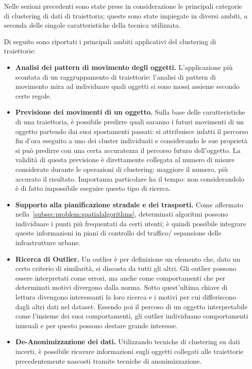 Nelle sezioni precedenti sono state prese in considerazione le principali categorie di clustering di dati di traiettoria; queste sono state impiegate in
diversi ambiti, a seconda delle singole caratteristiche della tecnica utilizzata.

Di seguito sono riportati i principali ambiti applicativi del clustering di traiettorie:

\begin{itemize}

  \item \textbf{Analisi dei pattern di movimento degli oggetti.}
  L'applicazione più scontata di un raggruppamento di traiettorie: l'analisi di pattern di
  movimento mira ad individuare quali oggetti si sono mossi assieme secondo certe regole.

  \item \textbf{Previsione dei movimenti di un oggetto.}
  Sulla base delle caratteristiche di una traiettoria, è possibile predirre quali saranno
  i futuri movimenti di un oggetto partendo dai suoi spostamenti passati: si attribuisce infatti
  il percorso fin d'ora eseguito a uno dei cluster individuati e considerando le sue proprietà
  si può predirre con una certa accuratezza il percorso futuro dell'oggetto.
  La validità di questa previsione è direttamente collegata al numero di misure considerate durante
  le operazioni di clustering: maggiore il numero, più accurato il risultato.
  Importanza particolare ha il tempo: non considerandolo è di fatto impossibile eseguire questo tipo
  di ricerca.

  \item \textbf{Supporto alla pianificazione stradale e dei trasporti.}
  Come affermato nella~\cref*{subsec:problem:spatialalgorithms}, determinati algoritmi
  possono individuare i punti più frequentati da certi utenti; è quindi possibile integrare queste
  informazioni in piani di controllo del traffico/ espansione delle infrastrutture urbane.

  \item \textbf{Ricerca di Outlier.}
  Un outlier è per definizione un elemento che, dato un certo criterio di similarità,
  si discosta da tutti gli altri. Gli outlier possono essere interpretati come errori, ma anche
  come comportamenti che per determinati motivi divergono dalla norma.
  Sotto quest'ultima chiave di lettura divengono interessanti la loro ricerca e i motivi per cui
  differiscono dagli altri dati nel dataset.
  Essendo poi il percoso di un oggetto interpretabile come l'insieme dei suoi comportamenti,
  gli outlier individuano comportamenti inusuali e per questo possono destare grande interesse.

  \item \textbf{De-Anonimizzazione dei dati.}
  Utilizzando tecniche di clustering su dati incerti, è possibile ricavare informazioni sugli
  oggetti collegati alle traiettorie precedentemente nascosti tramite tecniche di anonimizzazione.

\end{itemize}

